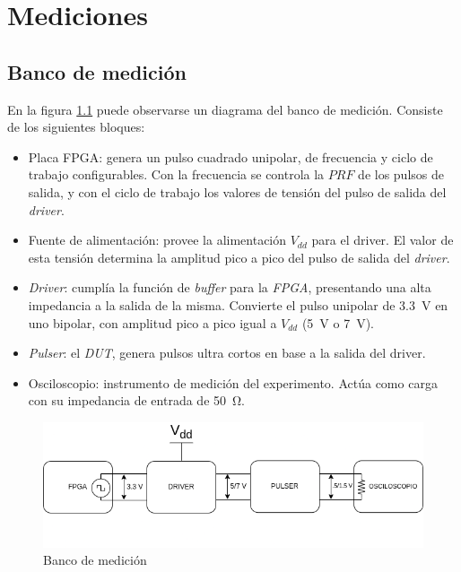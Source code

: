 \chapter{Mediciones}

\section{Banco de medición}

En la figura \ref{fig:banco_medicion} puede observarse un diagrama del banco de
medición. Consiste de los siguientes bloques:

\begin{itemize}
    \item Placa FPGA: genera un pulso cuadrado unipolar, de frecuencia y ciclo
      de trabajo configurables. Con la frecuencia se controla la $PRF$ de los
      pulsos de salida, y con el ciclo de trabajo los valores de tensión del
      pulso de salida del \textit{driver}.
    \item Fuente de alimentación: provee la alimentación $V_{dd}$ para el
      driver. El valor de esta tensión determina la amplitud pico a pico del
      pulso de salida del \textit{driver}.
    \item \textit{Driver}: cumplía la función de \textit{buffer} para la
      \textit{FPGA}, presentando una alta impedancia a la salida de la misma.
      Convierte el pulso unipolar de \qty{3.3}{\volt} en uno bipolar, con
      amplitud pico a pico igual a $V_{dd}$ (\qty{5}{\volt} o \qty{7}{\volt}).
    \item \textit{Pulser}: el \textit{DUT}, genera pulsos ultra cortos en base 
      a la salida del driver.
    \item Osciloscopio: instrumento de medición del experimento. Actúa como
      carga con su impedancia de entrada de \qty{50}{\ohm}.
\end{itemize}

\begin{figure}
  \centering
    \includegraphics[width=1\textwidth]{images/banco_medicion.drawio.png}
    \caption{Banco de medición}
    \label{fig:banco_medicion}
\end{figure}


